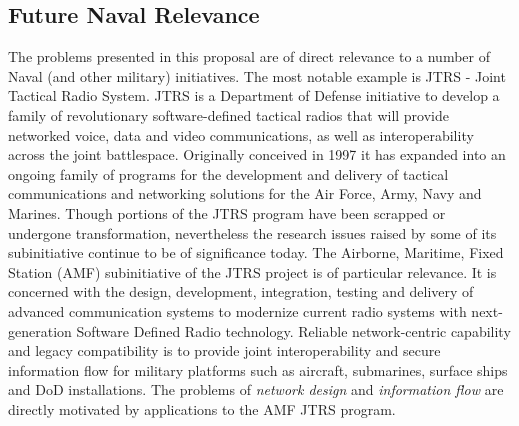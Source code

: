 \subsection{Future Naval Relevance}

The problems presented in this proposal are of direct relevance to a number of Naval (and other military) 
initiatives. The most notable example is JTRS \cite{feickert} - Joint Tactical Radio System. 
JTRS is a Department of 
Defense initiative to develop a family of revolutionary software-defined tactical radios 
that will provide networked voice, data and video communications, as well as interoperability 
across the joint battlespace. Originally conceived in 1997 it has expanded into an ongoing 
family of programs for the development and delivery of tactical communications and networking 
solutions for the Air Force, Army, Navy and Marines. Though portions of the JTRS program have
been scrapped or undergone transformation, nevertheless the research issues raised by some of 
its subinitiative continue to be of significance today.
The Airborne, Maritime, Fixed Station (AMF) subinitiative of the JTRS project is of particular 
relevance.  It is concerned with the design, development, integration, testing and delivery of
advanced communication systems to modernize current radio systems with next-generation 
Software Defined Radio technology. Reliable network-centric capability and legacy 
compatibility is to provide joint interoperability and secure information flow for 
military platforms such as aircraft, submarines, surface ships and DoD installations.
The problems of {\em network design} and {\em information flow} are directly motivated by
applications to the AMF JTRS program.

